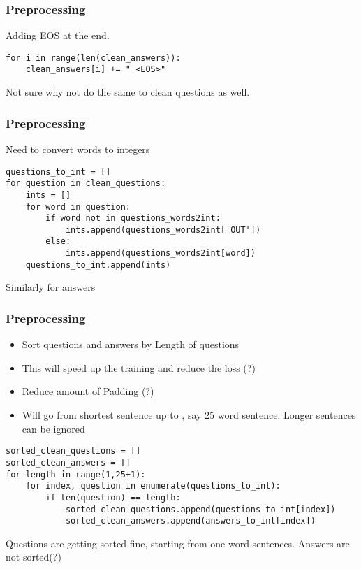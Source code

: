 \begin{frame}[fragile]\frametitle{Preprocessing}
Adding EOS at the end.
\begin{lstlisting}
for i in range(len(clean_answers)):
    clean_answers[i] += " <EOS>"
\end{lstlisting}
Not sure why not do the same to clean questions as well.
\end{frame}

\begin{frame}[fragile]\frametitle{Preprocessing}
Need to convert words to integers
\begin{lstlisting}
questions_to_int = []
for question in clean_questions:
    ints = []
    for word in question:
        if word not in questions_words2int:
            ints.append(questions_words2int['OUT'])
        else:
            ints.append(questions_words2int[word])
    questions_to_int.append(ints)
\end{lstlisting}
Similarly for answers
\end{frame}


\begin{frame}[fragile]\frametitle{Preprocessing}

\begin{itemize}
\item Sort questions and answers by Length of questions
\item This will speed up the training and reduce the loss (?)
\item Reduce amount of Padding (?)
\item Will go from shortest sentence up to , say 25 word sentence. Longer sentences can be ignored
\end{itemize}

\begin{lstlisting}
sorted_clean_questions = []
sorted_clean_answers = []
for length in range(1,25+1):
    for index, question in enumerate(questions_to_int):
        if len(question) == length:
            sorted_clean_questions.append(questions_to_int[index])
            sorted_clean_answers.append(answers_to_int[index])
\end{lstlisting}
Questions are getting sorted fine, starting from one word sentences. Answers are not sorted(?)
\end{frame}

